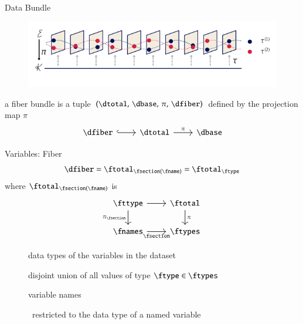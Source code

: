 \documentclass[xcolor={dvipsnames}, handout]{beamer}
\begin{document}
\begin{frame}{Data Bundle}
    \begin{figure}
        \includegraphics[width=1\textwidth]{figures/math/fiberbundle.png}
    \end{figure}
    a fiber bundle is a tuple $(\dtotal,\,\dbase,\,\pi ,\,\dfiber)$ defined by the projection map $\pi$
    \begin{equation}
        \label{eq:fiber_bundle}
        \begin{tikzcd}[ampersand replacement=\&]
            \dfiber \arrow[r, hook] \& \dtotal \arrow[r, "\pi"] \& \dbase
        \end{tikzcd}
    \end{equation}
\end{frame}

\begin{frame}{Variables: Fiber}
    \begin{equation}
        \dfiber = \ftotal_{\fsection(\fname)} = \ftotal_{\ftype} 
    \end{equation}
    where $\ftotal_{\fsection(\fname)}$ is 
    \begin{equation}
        \label{eq:data_types}
        \begin{tikzcd}[ampersand replacement=\&]
            \fttype \arrow[r] \arrow[d, "\pi_{\fsection}"'] \& \ftotal \arrow[d, "\pi"] \\
            \fnames \arrow[r, "\fsection"']                  \& \ftypes       
        \end{tikzcd}
    \end{equation}
    \begin{description}
        \item[\ftypes] data types of the variables in the dataset 
        \item[\ftotal] disjoint union of all values of type $\ftype \in \ftypes$ 
        \item[\fnames] variable names
        \item[\fttype] \ftotal\ restricted to the data type of a named variable   
    \end{description}
\end{frame}
\end{document}
